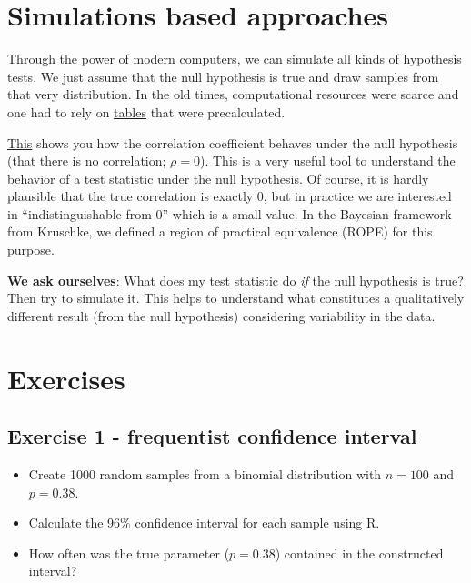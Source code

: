 \documentclass[
]{book}
\providecommand{\tightlist}{%
  \setlength{\itemsep}{0pt}\setlength{\parskip}{0pt}}
\begin{document}
\section{Simulations based approaches}\label{simulations-based-approaches}

Through the power of modern computers, we can simulate all kinds of hypothesis tests.
We just assume that the null hypothesis is true and draw samples from that very distribution.
In the old times, computational resources were scarce and one had to rely on
\href{https://digital.library.adelaide.edu.au/server/api/core/bitstreams/21f22d02-4a39-4650-8f09-71434ad02897/content}{tables}
that were precalculated.

\href{https://github.com/jdegenfellner/ZHAW_Teaching/blob/main/Variability_of_Correlation_under_H_0.R}{This}
shows you how the correlation coefficient behaves under the null hypothesis (that there is no correlation; \(\rho = 0\)).
This is a very useful tool to understand the behavior of a test statistic under the null hypothesis.
Of course, it is hardly plausible that the true correlation is exactly 0,
but in practice we are interested in ``indistinguishable from 0'' which is a small value.
In the Bayesian framework from Kruschke, we defined a region of practical equivalence (ROPE) for this purpose.

\textbf{We ask ourselves}: What does my test statistic do \emph{if} the null hypothesis is true?
Then try to simulate it. This helps to understand what constitutes a qualitatively different result
(from the null hypothesis) considering variability in the data.

\section{Exercises}\label{exercises-4}

\subsection{Exercise 1 - frequentist confidence interval}\label{exercise1_nhst}

\begin{itemize}
\tightlist
\item
  Create 1000 random samples from a binomial distribution with \(n = 100\) and \(p = 0.38\).
\item
  Calculate the 96\% confidence interval for each sample using R.
\item
  How often was the true parameter (\(p = 0.38\)) contained in the constructed interval?
\end{itemize}
\end{document}
